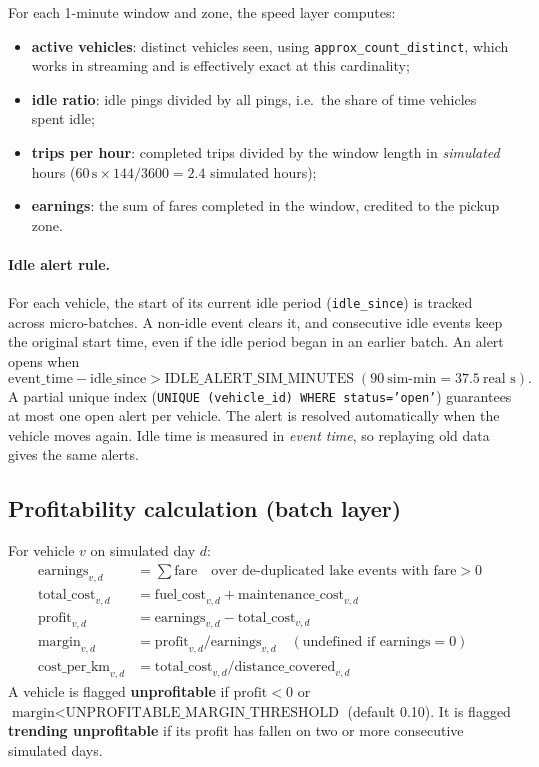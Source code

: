 \documentclass[11pt,a4paper]{article}
\newcommand{\code}[1]{\texttt{\small #1}}
\begin{document}
For each 1-minute window and zone, the speed layer computes:
\begin{itemize}
  \item \textbf{active vehicles}: distinct vehicles seen, using \code{approx\_count\_distinct},
    which works in streaming and is effectively exact at this cardinality;
  \item \textbf{idle ratio}: idle pings divided by all pings, i.e.\ the share of time vehicles
    spent idle;
  \item \textbf{trips per hour}: completed trips divided by the window length in
    \emph{simulated} hours ($60\,\text{s}\times144/3600 = 2.4$ simulated hours);
  \item \textbf{earnings}: the sum of fares completed in the window, credited to the pickup zone.
\end{itemize}

\paragraph{Idle alert rule.} For each vehicle, the start of its current idle period
(\code{idle\_since}) is tracked across micro-batches. A non-idle event clears it, and consecutive
idle events keep the original start time, even if the idle period began in an earlier batch. An
alert opens when
\[
  \text{event\_time} - \text{idle\_since} > \text{IDLE\_ALERT\_SIM\_MINUTES}
  \;(90\ \text{sim-min} = 37.5\ \text{real s}).
\]
A partial unique index (\code{UNIQUE (vehicle\_id) WHERE status='open'}) guarantees at most one
open alert per vehicle. The alert is resolved automatically when the vehicle moves again. Idle time
is measured in \emph{event time}, so replaying old data gives the same alerts.

\subsection{Profitability calculation (batch layer)}

For vehicle $v$ on simulated day $d$:
\begin{align*}
  \text{earnings}_{v,d} &= \textstyle\sum \text{fare} \quad\text{over de-duplicated lake events with fare}>0\\
  \text{total\_cost}_{v,d} &= \text{fuel\_cost}_{v,d} + \text{maintenance\_cost}_{v,d}\\
  \text{profit}_{v,d} &= \text{earnings}_{v,d} - \text{total\_cost}_{v,d}\\
  \text{margin}_{v,d} &= \text{profit}_{v,d} / \text{earnings}_{v,d}
     \quad(\text{undefined if earnings}=0)\\
  \text{cost\_per\_km}_{v,d} &= \text{total\_cost}_{v,d} / \text{distance\_covered}_{v,d}
\end{align*}
A vehicle is flagged \textbf{unprofitable} if $\text{profit}<0$ or
$\text{margin}<\text{UNPROFITABLE\_MARGIN\_THRESHOLD}$ (default 0.10). It is flagged
\textbf{trending unprofitable} if its profit has fallen on two or more consecutive simulated days.
\end{document}
